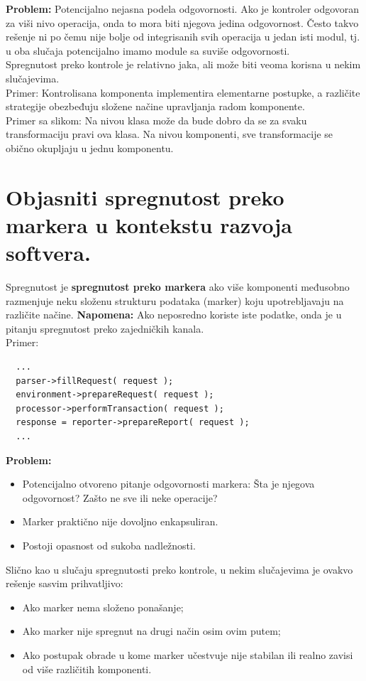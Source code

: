\documentclass[a4paper]{article}
\begin{document}
  \textbf{Problem:} Potencijalno nejasna podela odgovornosti. Ako je kontroler odgovoran
  za viši nivo operacija, onda to mora biti njegova jedina odgovornost. Često takvo rešenje 
  ni po čemu nije bolje od integrisanih svih operacija u jedan isti modul, tj. u oba slučaja
  potencijalno imamo module sa suviše odgovornosti.\\
  \indent Spregnutost preko kontrole je relativno jaka, ali može biti veoma korisna u nekim
  slučajevima. \\Primer: Kontrolisana komponenta implementira elementarne postupke, a različite
  strategije obezbeđuju složene načine upravljanja radom komponente. \\
  \indent Primer sa slikom:
  Na nivou klasa može da bude dobro da se za svaku transformaciju pravi ova klasa. Na nivou 
  komponenti, sve transformacije se obično okupljaju u jednu komponentu.

\section{Objasniti spregnutost preko markera u kontekstu razvoja softvera.}
  Spregnutost je \textbf{spregnutost preko markera} ako više komponenti međusobno razmenjuje
  neku složenu strukturu podataka (marker) koju upotrebljavaju na različite načine. 
  \textbf{Napomena:} Ako neposredno koriste iste podatke, onda je u pitanju spregnutost
  preko zajedničkih kanala. \\
  Primer:
\begin{lstlisting}
  ...
  parser->fillRequest( request );
  environment->prepareRequest( request );
  processor->performTransaction( request );
  response = reporter->prepareReport( request );
  ...\end{lstlisting}
  \textbf{Problem:}
  \begin{itemize}
    \item Potencijalno otvoreno pitanje odgovornosti markera: Šta je njegova odgovornost?
          Zašto ne sve ili neke operacije?
    \item Marker praktično nije dovoljno enkapsuliran.
    \item Postoji opasnost od sukoba nadležnosti.
  \end{itemize}
  Slično kao u slučaju spregnutosti preko kontrole, u nekim slučajevima je ovakvo rešenje
  sasvim prihvatljivo:
  \begin{itemize}
    \item Ako marker nema složeno ponašanje;
    \item Ako marker nije spregnut na drugi način osim ovim putem;
    \item Ako postupak obrade u kome marker učestvuje nije stabilan ili 
          realno zavisi od više različitih komponenti.
  \end{itemize}
\end{document}
